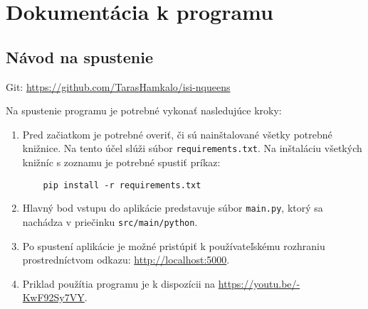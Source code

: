 \chapter{Dokumentácia k programu}

\section{Návod na spustenie}

Git: \url{https://github.com/TarasHamkalo/isi-nqueens}\par

Na spustenie programu je potrebné vykonať nasledujúce kroky:

\begin{enumerate}
  \item Pred začiatkom je potrebné overiť, či sú nainštalované všetky potrebné knižnice. Na tento účel slúži súbor \texttt{requirements.txt}. Na inštaláciu všetkých knižníc s zoznamu je potrebné spustiť príkaz:
  \begin{verbatim}
    pip install -r requirements.txt
  \end{verbatim}
  \item Hlavný bod vstupu do aplikácie predstavuje súbor \texttt{main.py}, ktorý sa nachádza v priečinku \texttt{src/main/python}.
  \item Po spustení aplikácie je možné pristúpiť k používateľskému rozhraniu prostredníctvom odkazu: \url{http://localhost:5000}.
  \item Priklad použítia programu je k dispozícii na \url{https://youtu.be/-KwF92Sy7VY}.
\end{enumerate}
